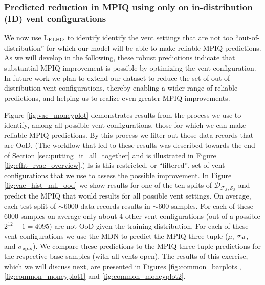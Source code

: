 \subsubsection{Predicted reduction in MPIQ using only on in-distribution (ID) vent configurations}\label{results_idventconfigs}
We now use L$_{\rm ELBO}$ to identify identify the vent settings that are not too ``out-of-distribution'' for which our model will be able to make reliable MPIQ predictions.  As we will develop in the following, these robust predictions indicate that substantial MPIQ improvement is possible by optimizing the vent configuration.  In future work we plan to extend our dataset to reduce the set of out-of-distribution vent configurations, thereby enabling a wider range of reliable predictions, and helping us to realize even greater MPIQ improvements.

Figure \ref{fig:vae_moneyplot} demonstrates  results from the process we use to identify, among all possible vent configurations, those for which we can make reliable MPIQ predictions.  By this process we filter out those data records that are OoD. (The workflow that led to these results was described towards the end of Section \ref{sec:putting_it_all_together} and is illustrated in Figure \ref{fig:cfht_rvae_overview}.)
Is is this restricted, or ``filtered'', set of vent configurations that we use to assess the possible improvement.  In Figure \ref{fig:vae_hist_mll_ood} we show  results for one of the ten splits of $\mathcal{D_{F_S,S_S}}$ and predict the MPIQ that would results for all possible vent settings. On average, each test split of $\sim6000$ data records results in $\sim600$ samples.  For each of these $6000$ samples on average only about $4$  other vent configurations (out of a possible $2^{12} -1 = 4095$) are not OoD given the training distribution. For each of these vent configurations we use the MDN to predict the MPIQ three-tuple ($\mu$, $\sigma_{\rm al}$, and $\sigma_{\rm epis}$).  We compare these predictions to the MPIQ three-tuple predictions for the respective base samples (with all vents open).
The results of this exercise, which we will discuss next, are presented in Figures \ref{fig:common_barplots}, \ref{fig:common_moneyplot1} and \ref{fig:common_moneyplot2}. 

